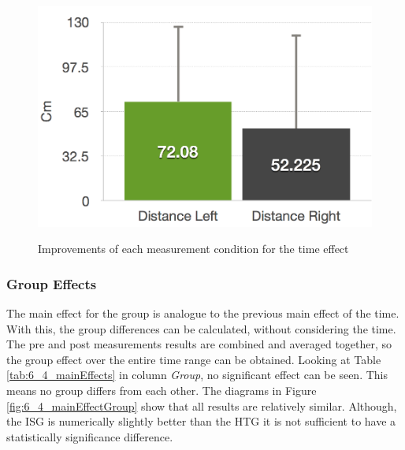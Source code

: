 \begin{figure}[htb]
		\hfill
	\begin{minipage}[t]{0.32\linewidth}
		\centering
		\includegraphics[width=1\linewidth]{Pictures/6_4_DIA_DistanceAllDiff}
		\label{fig:6_4_distanceAllDiff}
	\end{minipage}
	\caption{Improvements of each measurement condition for the time effect}
	\label{fig:6_4_timeImprovement}
\end{figure}

\subsubsection{Group Effects}
The main effect for the group is analogue to the previous main effect of the time.
With this, the group differences can be calculated, without considering the time.
The pre and post measurements results are combined and averaged together, so the group effect over the entire time range can be obtained.
Looking at Table \ref{tab:6_4_mainEffects} in column \textit{Group}, no significant effect can be seen.
This means no group differs from each other.
The diagrams in Figure \ref{fig:6_4_mainEffectGroup} show that all results are relatively similar.
Although, the ISG is numerically slightly better than the HTG it is not sufficient to have a statistically significance difference.


